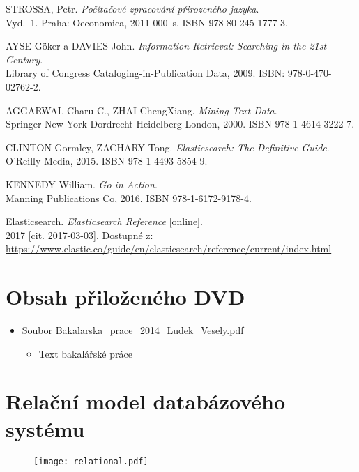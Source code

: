 \documentclass[FM,DP]{tulthesis}
\begin{document}
\begin{thebibliography}{Mm99}

 STROSSA, Petr. \emph{Počítačové zpracování přirozeného jazyka}. \\
Vyd.~1. Praha: Oeconomica, 2011 000~s. ISBN 978-80-245-1777-3. %

 AYSE Göker a DAVIES John. \emph{Information Retrieval: Searching in the 21st Century}. \\
Library of Congress Cataloging-in-Publication Data, 2009. ISBN: 978-0-470-02762-2. %

 AGGARWAL Charu C., ZHAI ChengXiang. \emph{Mining Text Data}. \\
Springer New York Dordrecht Heidelberg London, 2000. ISBN 978-1-4614-3222-7. %

 CLINTON Gormley, ZACHARY Tong. \emph{Elasticsearch: The Definitive Guide}. \\
O'Reilly Media, 2015. ISBN 978-1-4493-5854-9. %

 KENNEDY William. \emph{Go in Action}. \\
Manning Publications Co, 2016. ISBN 978-1-6172-9178-4. %

 Elasticsearch. \emph{Elasticsearch Reference} [online]. \\
2017 [cit. 2017-03-03]. Dostupné z:\\
\url{https://www.elastic.co/guide/en/elasticsearch/reference/current/index.html}

\end{thebibliography}


\appendix

\chapter{Obsah přiloženého DVD}

\begin{itemize}
\item Soubor Bakalarska\_prace\_2014\_Ludek\_Vesely.pdf
\begin{itemize}
	\item Text bakalářské práce
\end{itemize}

\end{itemize}

\chapter{Relační model databázového systému}

\begin{figure}[h]
\center
\texttt{[image: relational.pdf]}
\end{figure}


\end{document}

